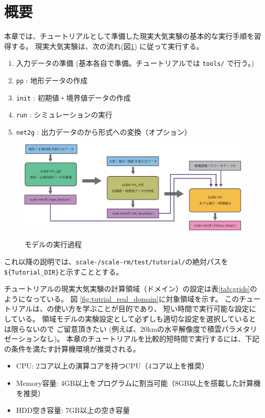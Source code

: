 \section{概要} \label{sec:tutrial_real_intro}
本章では、チュートリアルとして準備した現実大気実験の基本的な実行手順を習得する。
現実大気実験は、次の流れ(図\ref{fig:howto}) に従って実行する。
\begin{enumerate}
\item  入力データの準備 (基本各自で準備。チュートリアルでは \verb|tools/| で行う。)
\item  \texttt{pp}      : 地形データの作成
\item  \texttt{init}    : 初期値・境界値データの作成
\item  \texttt{run}     : シミュレーションの実行
\item  \texttt{net2g}   : 出力データの\netcdf から\grads 形式への変換（オプション）
\end{enumerate}

\begin{figure}[b]
\begin{center}
  \includegraphics[width=0.9\hsize]{./figure/real_procedure.eps}\\
  \caption{\scalerm モデルの実行過程}
  \label{fig:howto}
\end{center}
\end{figure}


これ以降の説明では、\texttt{scale-{\version}/scale-rm/test/tutorial/}の絶対パスを
\verb|${Tutorial_DIR}|と示すこととする。


チュートリアルの現実大気実験の計算領域（ドメイン）の設定は表\ref{tab:grids}のようになっている。
図 \ref{fig:tutrial_real_domain}に対象領域を示す。
このチュートリアルは、\scalerm の使い方を学ぶことが目的であり、
短い時間で実行可能な設定にしている。
領域モデルの実験設定として必ずしも適切な設定を選択しているとは限らないので
ご留意頂きたい
(例えば、20kmの水平解像度で積雲パラメタリゼーションなし)。
本章のチュートリアルを比較的短時間で実行するには、下記の条件を満たす計算機環境が推奨される。
\begin{itemize}
\item CPU: 2コア以上の演算コアを持つCPU（4コア以上を推奨）
\item Memory容量: 4GB以上をプログラムに割当可能（8GB以上を搭載した計算機を推奨）
\item HDD空き容量: 7GB以上の空き容量
\end{itemize}


